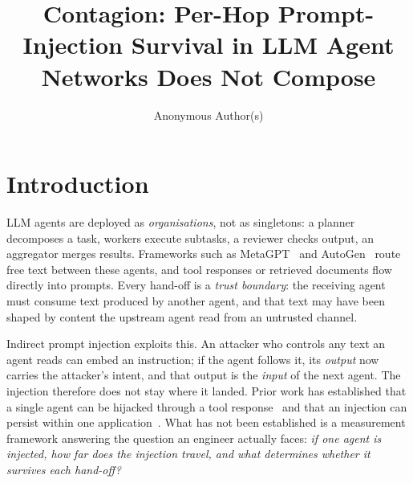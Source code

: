 \documentclass[sigconf,anonymous]{aamas}
\title[Per-Hop Prompt-Injection Survival Does Not Compose]{Contagion: Per-Hop Prompt-Injection Survival in LLM Agent Networks Does Not Compose}
\author{Anonymous Author(s)}
\affiliation{
  \institution{Anonymous Institution}
  \city{Anonymous City}
  \country{Anonymous Country}}
\begin{document}
\setlength{\emergencystretch}{2.5em}




\maketitle


\section{Introduction}

LLM agents are deployed as \emph{organisations}, not as singletons: a planner
decomposes a task, workers execute subtasks, a reviewer checks output, an
aggregator merges results. Frameworks such as MetaGPT~\cite{Hong2023MetaGPT} and
AutoGen~\cite{Wu2023AutoGen} route free text between these agents, and tool
responses or retrieved documents flow directly into prompts. Every hand-off is a
\emph{trust boundary}: the receiving agent must consume text produced by another
agent, and that text may have been shaped by content the upstream agent read from
an untrusted channel.

Indirect prompt injection exploits this. An attacker who controls any text an
agent reads can embed an instruction; if the agent follows it, its \emph{output}
now carries the attacker's intent, and that output is the \emph{input} of the next
agent. The injection therefore does not stay where it landed. Prior work has
established that a single agent can be hijacked through a tool
response~\cite{Zhan2024InjecAgent,Debenedetti2024AgentDojo} and that an injection
can persist within one application~\cite{Greshake2023}. What has not been
established is a measurement framework answering the question an engineer
actually faces: \emph{if one agent is injected, how far does the injection
travel, and what determines whether it survives each hand-off?}
\end{document}
